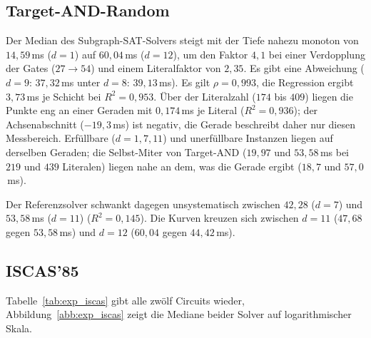 \subsection{Target-AND-Random}
\label{sec:exp_tiefe}

Der Median des Subgraph-SAT-Solvers steigt mit der Tiefe nahezu monoton von $14{,}59$\,ms ($d=1$) auf $60{,}04$\,ms ($d=12$), um den Faktor $4{,}1$ bei einer Verdopplung der Gates ($27\to54$) und einem Literalfaktor von $2{,}35$. Es gibt eine Abweichung ($d=9$: $37{,}32$\,ms unter $d=8$: $39{,}13$\,ms). Es gilt $\rho=0{,}993$, die Regression ergibt $3{,}73$\,ms je Schicht bei $R^2=0{,}953$. Über der Literalzahl ($174$ bis $409$) liegen die Punkte eng an einer Geraden mit $0{,}174$\,ms je Literal ($R^2=0{,}936$); der Achsenabschnitt ($-19{,}3$\,ms) ist negativ, die Gerade beschreibt daher nur diesen Messbereich. Erfüllbare ($d=1,7,11$) und unerfüllbare Instanzen liegen auf derselben Geraden; die Selbst-Miter von Target-AND ($19{,}97$ und $53{,}58$\,ms bei $219$ und $439$ Literalen) liegen nahe an dem, was die Gerade ergibt ($18{,}7$ und $57{,}0$\,ms).

Der Referenzsolver schwankt dagegen unsystematisch zwischen $42{,}28$ ($d=7$) und $53{,}58$\,ms ($d=11$) ($R^2=0{,}145$). Die Kurven kreuzen sich zwischen $d=11$ ($47{,}68$ gegen $53{,}58$\,ms) und $d=12$ ($60{,}04$ gegen $44{,}42$\,ms).

\subsection{ISCAS'85}
\label{sec:exp_iscas}

Tabelle~\ref{tab:exp_iscas} gibt alle zwölf Circuits wieder, Abbildung~\ref{abb:exp_iscas} zeigt die Mediane beider Solver auf logarithmischer Skala.

